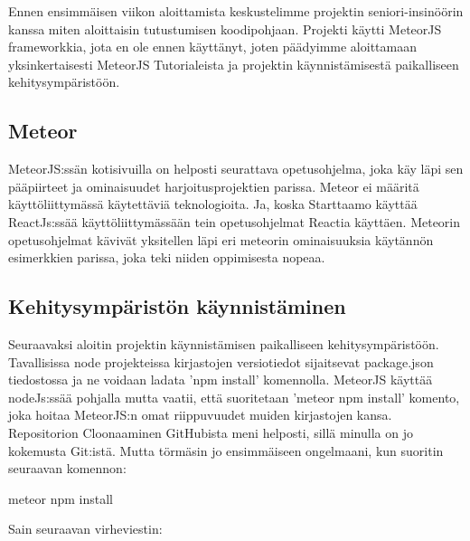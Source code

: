 \documentclass[11pt,a4paper,titlepage,oneside]{article}
\begin{document}
Ennen ensimmäisen viikon aloittamista keskustelimme projektin seniori-insinöörin kanssa miten aloittaisin tutustumisen koodipohjaan.
Projekti käytti MeteorJS frameworkkia, jota en ole ennen käyttänyt, joten päädyimme aloittamaan yksinkertaisesti MeteorJS Tutorialeista ja projektin käynnistämisestä paikalliseen kehitysympäristöön.\medskip

\subsection*{Meteor}

MeteorJS:ssän kotisivuilla on helposti seurattava opetusohjelma, joka käy läpi sen pääpiirteet ja ominaisuudet harjoitusprojektien parissa. 
Meteor ei määritä käyttöliittymässä käytettäviä teknologioita. Ja, koska Starttaamo käyttää ReactJs:ssää käyttöliittymässään tein opetusohjelmat Reactia käyttäen.
Meteorin opetusohjelmat kävivät yksitellen läpi eri meteorin ominaisuuksia käytännön esimerkkien parissa, joka teki niiden oppimisesta nopeaa.\medskip




\subsection*{Kehitysympäristön käynnistäminen}

Seuraavaksi aloitin projektin käynnistämisen paikalliseen kehitysympäristöön.
Tavallisissa node projekteissa kirjastojen versiotiedot sijaitsevat package.json tiedostossa ja ne voidaan ladata 'npm install' komennolla.
MeteorJS käyttää nodeJs:ssää pohjalla mutta vaatii, että suoritetaan 'meteor npm install' komento, joka hoitaa MeteorJS:n omat riippuvuudet muiden kirjastojen kansa.
Repositorion Cloonaaminen GitHubista meni helposti, sillä minulla on jo kokemusta Git:istä. Mutta törmäsin jo ensimmäiseen ongelmaani, kun suoritin seuraavan komennon:

\begin{tcolorbox}
meteor npm install
\end{tcolorbox}
\medskip



Sain seuraavan virheviestin:
\end{document}
